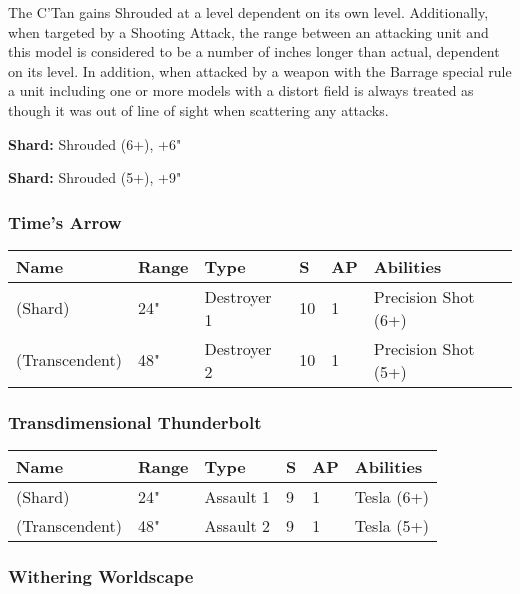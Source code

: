 The C'Tan gains Shrouded at a level dependent on its own level. Additionally, when targeted by a Shooting Attack, the range between an attacking unit and this model is considered to be a number of inches longer than actual, dependent on its level. In addition, when attacked by a weapon with the Barrage special rule a unit including one or more models with a distort field is always treated as though it was out of line of sight when scattering any attacks.

\textbf{Shard:} Shrouded (6+), +6"

\textbf{Shard:} Shrouded (5+), +9"

\subsubsection{Time's Arrow} \label{Time's Arrow}

\noindent
\begin{tabular}{||m{160pt} m{31pt} m{55pt} m{12pt} m{12pt} m{200pt}||}
	\hline
	Name & Range & Type & S & AP & Abilities \\
	\hline
	\quickref{Time's Arrow} (Shard) & 24" & Destroyer 1 & 10 & 1 & Precision Shot (6+) \\
	\quickref{Time's Arrow} (Transcendent) & 48" & Destroyer 2 & 10 & 1 & Precision Shot (5+) \\
	\hline
\end{tabular}

\subsubsection{Transdimensional Thunderbolt} \label{Transdimensional Thunderbolt}

\noindent
\begin{tabular}{||m{160pt} m{31pt} m{55pt} m{12pt} m{12pt} m{200pt}||}
	\hline
	Name & Range & Type & S & AP & Abilities \\
	\hline
	\quickref{Transdimensional Thunderbolt} (Shard) & 24" & Assault 1 & 9 & 1 & Tesla (6+) \\
	\quickref{Transdimensional Thunderbolt} (Transcendent) & 48" & Assault 2 & 9 & 1 & Tesla (5+) \\
	\hline
\end{tabular}

\subsubsection{Withering Worldscape} \label{Withering Worldscape}

